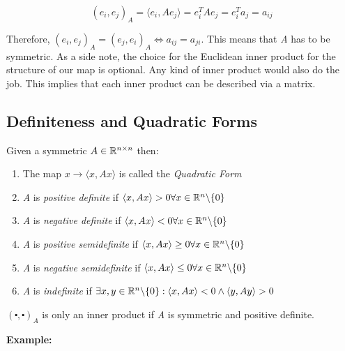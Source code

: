 \[
    (e_i, e_j)_A = \langle e_i, Ae_j\rangle = e_{i}^{T} A e_j = e_{i}^{T} a_j = a_{ij} 
\]

Therefore, \((e_i, e_j)_A = (e_j, e_i)_A \iff a_{ij} = a_{ji}\). This means that \emph{A} has to be symmetric.
As a side note, the choice for the Euclidean inner product for the structure of our map is optional. Any
kind of inner product would also do the job. This implies that each inner product can be described via a 
matrix.

\subsection{Definiteness and Quadratic Forms}

Given a symmetric \(A \in \mathbb{R}^{n \times n}\) then:

\begin{enumerate}
    
    \item The map \(x \to \langle x, Ax\rangle\) is called the \emph{Quadratic Form}
    
    \item \emph{A} is \emph{positive definite} if \(\langle x, Ax \rangle > 0 \forall x \in \mathbb{R}^n 
          \backslash \{0\}\)

    \item \emph{A} is \emph{negative definite} if \(\langle x, Ax \rangle < 0 \forall x \in \mathbb{R}^n 
          \backslash \{0\}\)
    
    \item \emph{A} is \emph{positive semidefinite} if \(\langle x, Ax \rangle \ge 0 \forall x \in \mathbb{R}^n 
          \backslash \{0\}\)

    \item \emph{A} is \emph{negative semidefinite} if \(\langle x, Ax \rangle \le 0 \forall x \in \mathbb{R}^n 
          \backslash \{0\}\)

    \item \emph{A} is \emph{indefinite} if \(\exists x,y \in \mathbb{R}^n  \backslash \{0\}: \langle x, Ax\rangle 
          < 0 \land \langle y, Ay \rangle > 0 \)
    
\end{enumerate}

\((\centerdot , \centerdot)_A\) is only an inner product if \emph{A} is symmetric and positive definite.
\vspace{\baselineskip}

\textbf{Example:}
\vspace{\baselineskip}

